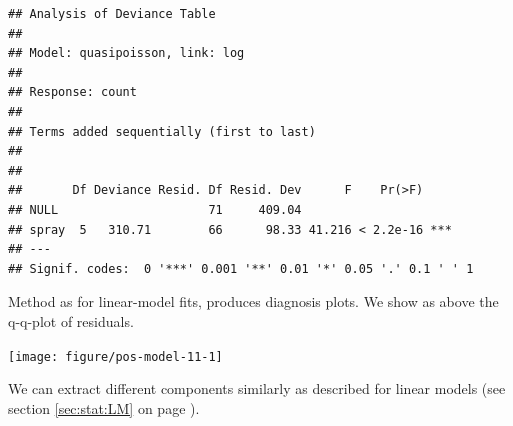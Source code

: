 \documentclass[krantz2]{krantz}\usepackage{knitr}%
\begin{document}
\begin{knitrout}\footnotesize
{}\color{fgcolor}\begin{kframe}
\begin{alltt}
  \hlstd{=} \hlstd{)}
\end{alltt}
\begin{verbatim}
## Analysis of Deviance Table
## 
## Model: quasipoisson, link: log
## 
## Response: count
## 
## Terms added sequentially (first to last)
## 
## 
##       Df Deviance Resid. Df Resid. Dev      F    Pr(>F)    
## NULL                     71     409.04                     
## spray  5   310.71        66      98.33 41.216 < 2.2e-16 ***
## ---
## Signif. codes:  0 '***' 0.001 '**' 0.01 '*' 0.05 '.' 0.1 ' ' 1
\end{verbatim}
\end{kframe}
\end{knitrout}

Method  as for linear-model fits, produces diagnosis plots. We show as above the q-q-plot of residuals.

\begin{knitrout}\footnotesize
{}\color{fgcolor}\begin{kframe}
\begin{alltt}
  \hlstd{=} \hlstd{)}
\end{alltt}
\end{kframe}

{\centering \texttt{[image: figure/pos-model-11-1]} 

}



\end{knitrout}

We can extract different components similarly as described for linear models (see section \ref{sec:stat:LM} on page \pageref{sec:stat:LM}).
\end{document}
